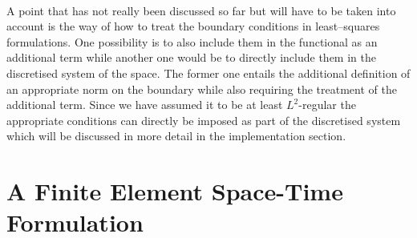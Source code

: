\documentclass[../draft_1.tex]{subfiles}
\begin{document}
\smallskip
\\
A point that has not really been discussed so far but will have to be taken into account is the way of how to treat the boundary conditions in least--squares formulations. One possibility is to also include them in the functional as an additional term while another one would be to directly include them in the discretised system of the space. The former one entails the additional definition of an appropriate norm on the boundary while also requiring the treatment of the additional term. Since we have assumed it to be at least $L^2$-regular the appropriate conditions can directly be imposed as part of the discretised system which will be discussed in more detail in the implementation section.

\section{A Finite Element Space-Time Formulation}
\end{document}
